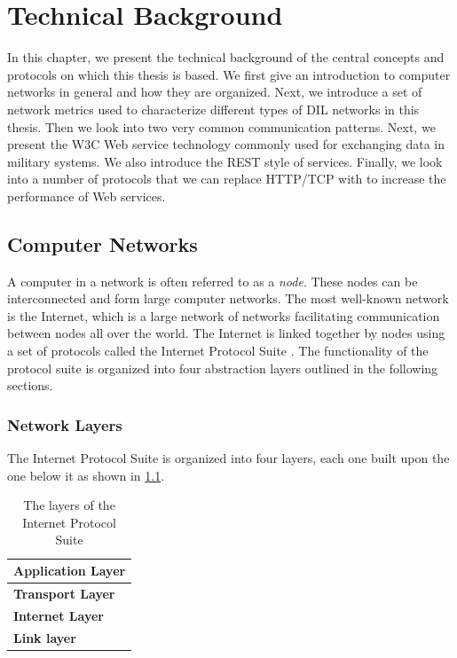 \chapter{Technical Background}
\label{chapter:background}

In this chapter, we present the technical background of the central concepts and
protocols on which this thesis is based. We first give an introduction to computer
networks in general and how they are organized. Next, we introduce a set of
network metrics used to characterize different types of DIL networks in this
thesis. Then we look into two very common communication patterns. Next, we
present the W3C Web service technology commonly used for exchanging data in
military systems. We also introduce the REST style of services. Finally, we look
into a number of protocols that we can replace HTTP/TCP with to increase the
performance of Web services.


\section{Computer Networks}

A computer in a network is often referred to as a \textit{node}. These nodes can
be interconnected and form large computer networks. The most well-known network
is the Internet, which is a large network of networks facilitating communication
between nodes all over the world. The Internet is linked together by nodes using
a set of protocols called the Internet Protocol Suite \cite{rfc-1122}. The
functionality of the protocol suite is organized into four abstraction layers
outlined in the following sections.

\subsection{Network Layers}

The Internet Protocol Suite is organized into four layers, each one built upon
the one below it as shown in \cref{figure-network-layers}.

\begin{table}[h]
\begin{tabularx}{0.5\textwidth}{| X |}
\hline
  \textbf{Application Layer} \\ \hline
  \textbf{Transport Layer} \\ \hline
  \textbf{Internet Layer} \\ \hline
  \textbf{Link layer} \\ \hline
\end{tabularx}
\caption{The layers of the Internet Protocol Suite}
\label{figure-network-layers}
\end{table}

